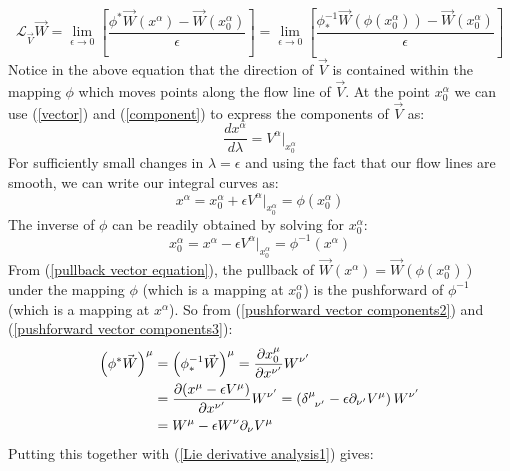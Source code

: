\documentclass[10pt]{article}
\begin{document}
\begin{equation}
\label{Lie derivative analysis1}
  \mathcal{L}_{\vec V} \vec W = \lim\limits _{\epsilon \rightarrow 0}\left[\frac{\phi^\ast \vec W(x^\alpha)-\vec W(x^\alpha_0)}{\epsilon}\right]= \lim\limits _{\epsilon \rightarrow 0}\left[\frac{\phi_\ast^{-1} \vec W(\phi(x^\alpha_0))-\vec W(x^\alpha_0)}{\epsilon}\right]
\end{equation}
Notice in the above equation that the direction of $\vec V$ is contained within the mapping $\phi$ which moves points along the flow line of $\vec V$.  At the point $x^\alpha_0$ we can use (\ref{vector}) and (\ref{component}) to express the components of $\vec V$ as:
\begin{equation}
   \frac{dx^{\alpha}}{d\lambda}=V^\alpha  \Big|_{x^\alpha_0}
\end{equation}
For sufficiently small changes in $\lambda = \epsilon$ and using the fact that our flow lines are smooth, we can write our integral curves as:
\begin{equation}
   x^\alpha=x^\alpha_0 + \epsilon V^\alpha \Big|_{x^\alpha_0}=\phi(x^\alpha_0)
\end{equation}
The inverse of $\phi$ can be readily obtained by solving for $x^\alpha_0$:
\begin{equation}
   x^\alpha_0 =x^\alpha - \epsilon V^\alpha \Big|_{x^\alpha_0}=\phi^{-1}(x^\alpha)
\end{equation}
From (\ref{pullback vector equation}), the pullback of $\vec W(x^\alpha)=\vec W(\phi(x^\alpha_0))$ under the mapping $\phi$ (which is a mapping at $x^\alpha_0$) is the pushforward of $\phi^{-1}$ (which is a mapping at $x^\alpha$). So from (\ref{pushforward vector components2}) and (\ref{pushforward vector components3}):
\begin{equation}
\begin{aligned}
   \left(\phi^\ast \vec W\right)^\mu &=\left(\phi^{-1}_\ast \vec W\right)^\mu =\frac {\partial x^\mu_0}{\partial x^{\nu^\prime}} W^{\nu^\prime} \\
&=\frac {\partial (x^\mu - \epsilon V^\mu)}{\partial x^{\nu^\prime}} W^{\nu^\prime}=\left(\tensor{\delta}{^\mu_{\nu^\prime}}-\epsilon \partial_{\nu^\prime} V^\mu \right) W^{\nu^\prime}\\
&=W^\mu-\epsilon W^\nu \partial_\nu V^\mu
\end{aligned}
\end{equation}
Putting this together with (\ref{Lie derivative analysis1}) gives:
\end{document}

